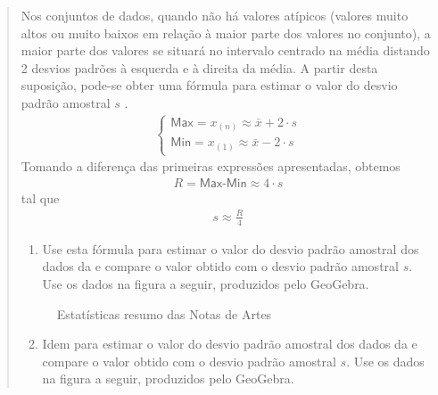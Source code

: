 \begin{quote}

Nos conjuntos de dados, quando não há valores atípicos (valores muito altos ou muito baixos em relação à maior parte dos valores no conjunto), a maior parte dos valores se situará no intervalo centrado na média distando 2 desvios padrões à esquerda e à direita da média. A partir desta suposição, pode-se obter uma fórmula para estimar o valor do desvio padrão amostral \(s\) .
\begin{equation*}
\begin{split}\left \{ \begin{array}{l} \textsf{Max}=x_{(n)}\approx \bar{x}+2\cdot s \\ \textsf{Min}=x_{(1)}\approx \bar{x}-2\cdot s\end{array}\right.\end{split}
\end{equation*}
Tomando a diferença das primeiras expressões apresentadas, obtemos
\begin{equation*}
\begin{split}R= \textsf{Max-Min} \approx 4\cdot s\end{split}
\end{equation*}
tal que
\begin{equation*}
\begin{split}s\approx \frac{R}{4}\end{split}
\end{equation*}\begin{enumerate}
\item {} 
Use esta fórmula para estimar o valor do desvio padrão amostral dos dados da  e compare o valor obtido com o desvio padrão amostral \(s\). Use os dados na figura a seguir, produzidos pelo GeoGebra.

\end{enumerate}

\begin{figure}[H]
\centering
\capstart

\noindent{}
\caption{Estatísticas resumo das Notas de Artes}\label{\detokenize{PE104-5:fig-resumonartes}}\label{\detokenize{PE104-5:id2}}\end{figure}
\begin{enumerate}
\setcounter{enumi}{1}
\item {} 
Idem para estimar o valor do desvio padrão amostral dos dados da  e compare o valor obtido com o desvio padrão amostral \(s\). Use os dados na figura a seguir, produzidos pelo GeoGebra.


\end{enumerate}
\end{quote}
